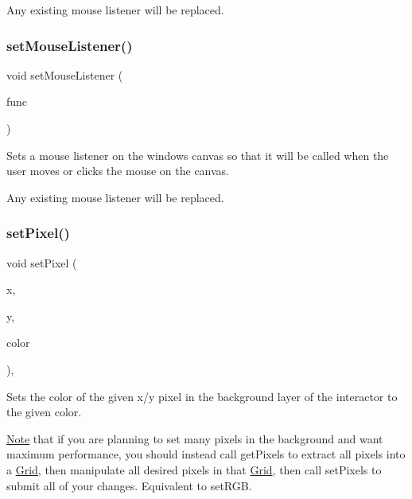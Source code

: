 Any existing mouse listener will be replaced. \mbox{\label{classGWindow_aea7f647ea62d59f71b5fad6aa65eeaf9}} 
\subsubsection{\texorpdfstring{set\+Mouse\+Listener()}{setMouseListener()}\hspace{0.1cm}{\footnotesize\ttfamily [2/2]}}
{\footnotesize\ttfamily void set\+Mouse\+Listener (\begin{DoxyParamCaption}\item[{G\+Event\+Listener\+Void}]{func }\end{DoxyParamCaption})\hspace{0.3cm}{\ttfamily [virtual]}}



Sets a mouse listener on the window\textquotesingle{}s canvas so that it will be called when the user moves or clicks the mouse on the canvas. 

Any existing mouse listener will be replaced. \mbox{\label{classGDrawingSurface_a09f9640e4ff7388dcfc391efd88d2415}} 
\subsubsection{\texorpdfstring{set\+Pixel()}{setPixel()}\hspace{0.1cm}{\footnotesize\ttfamily [1/3]}}
{\footnotesize\ttfamily void set\+Pixel (\begin{DoxyParamCaption}\item[{double}]{x,  }\item[{double}]{y,  }\item[{const std\+::string \&}]{color }\end{DoxyParamCaption})\hspace{0.3cm}{\ttfamily [virtual]}, {\ttfamily [inherited]}}



Sets the color of the given x/y pixel in the background layer of the interactor to the given color. 

\mbox{\hyperlink{classNote}{Note}} that if you are planning to set many pixels in the background and want maximum performance, you should instead call get\+Pixels to extract all pixels into a \mbox{\hyperlink{classGrid}{Grid}}, then manipulate all desired pixels in that \mbox{\hyperlink{classGrid}{Grid}}, then call set\+Pixels to submit all of your changes. Equivalent to set\+R\+GB.


